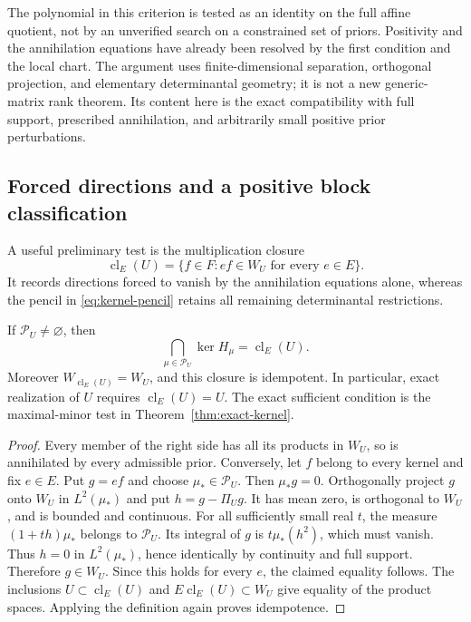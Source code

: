 The polynomial in this criterion is tested as an identity on the full
affine quotient, not by an unverified search on a constrained set of
priors. Positivity and the annihilation equations have already been
resolved by the first condition and the local chart. The argument uses
finite-dimensional separation, orthogonal projection, and elementary
determinantal geometry; it is not a new generic-matrix rank theorem.
Its content here is the exact compatibility with full support, prescribed
annihilation, and arbitrarily small positive prior perturbations.

\subsection{Forced directions and a positive block classification}
A useful preliminary test is the multiplication closure
\begin{equation}\label{eq:kernel-closure}
 \operatorname{cl}_E(U)=\{f\in F: ef\in W_U\text{ for every }e\in E\}.
\end{equation}
It records directions forced to vanish by the annihilation equations
alone, whereas the pencil in \eqref{eq:kernel-pencil} retains all
remaining determinantal restrictions.

\begin{proposition}
\label{prop:forced-kernel}
If $\mathcal P_U\ne\varnothing$, then
\begin{equation}\label{eq:forced-kernel-intersection}
 \bigcap_{\mu\in\mathcal P_U}\ker H_\mu=\operatorname{cl}_E(U).
\end{equation}
Moreover $W_{\operatorname{cl}_E(U)}=W_U$, and this closure is
idempotent. In particular, exact realization of $U$ requires
$\operatorname{cl}_E(U)=U$. The exact sufficient condition is the
maximal-minor test in Theorem~\ref{thm:exact-kernel}.
\end{proposition}
\begin{proof}
Every member of the right side has all its products in $W_U$, so is
annihilated by every admissible prior. Conversely, let $f$ belong to
every kernel and fix $e\in E$. Put $g=ef$ and choose
$\mu_*\in\mathcal P_U$. Then $\mu_*g=0$. Orthogonally project $g$
onto $W_U$ in $L^2(\mu_*)$ and put $h=g-\Pi_U g$. It has mean
zero, is orthogonal to $W_U$, and is bounded and continuous. For all
sufficiently small real $t$, the measure $(1+th)\mu_*$ belongs to
$\mathcal P_U$. Its integral of $g$ is $t\mu_*(h^2)$, which must
vanish. Thus $h=0$ in $L^2(\mu_*)$, hence identically by continuity
and full support. Therefore $g\in W_U$. Since this holds for every
$e$, the claimed equality follows. The inclusions
$U\subset\operatorname{cl}_E(U)$ and
$E\operatorname{cl}_E(U)\subset W_U$ give equality of the product
spaces. Applying the definition again proves idempotence.
\end{proof}


